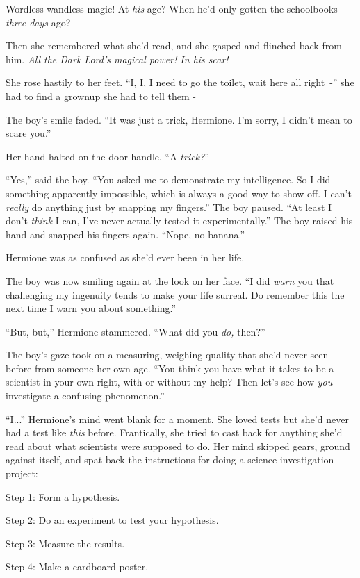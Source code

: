 Wordless wandless magic! At \emph{his} age? When he'd only gotten the schoolbooks \emph{three days} ago?

Then she remembered what she'd read, and she gasped and flinched back from him. \emph{All the Dark Lord's magical power! In his scar!}

She rose hastily to her feet. ``I, I, I need to go the toilet, wait here all right~-'' she had to find a grownup she had to tell them -

The boy's smile faded. ``It was just a trick, Hermione. I'm sorry, I didn't mean to scare you.''

Her hand halted on the door handle. ``A \emph{trick?}''

``Yes,'' said the boy. ``You asked me to demonstrate my intelligence. So I did something apparently impossible, which is always a good way to show off. I can't \emph{really} do anything just by snapping my fingers.'' The boy paused. ``At least I don't \emph{think} I can, I've never actually tested it experimentally.'' The boy raised his hand and snapped his fingers again. ``Nope, no banana.''

Hermione was as confused as she'd ever been in her life.

The boy was now smiling again at the look on her face. ``I did \emph{warn} you that challenging my ingenuity tends to make your life surreal. Do remember this the next time I warn you about something.''

``But, but,'' Hermione stammered. ``What did you \emph{do,} then?''

The boy's gaze took on a measuring, weighing quality that she'd never seen before from someone her own age. ``You think you have what it takes to be a scientist in your own right, with or without my help? Then let's see how \emph{you} investigate a confusing phenomenon.''

``I...'' Hermione's mind went blank for a moment. She loved tests but she'd never had a test like \emph{this} before. Frantically, she tried to cast back for anything she'd read about what scientists were supposed to do. Her mind skipped gears, ground against itself, and spat back the instructions for doing a science investigation project:

Step 1: Form a hypothesis.

Step 2: Do an experiment to test your hypothesis.

Step 3: Measure the results.

Step 4: Make a cardboard poster.

